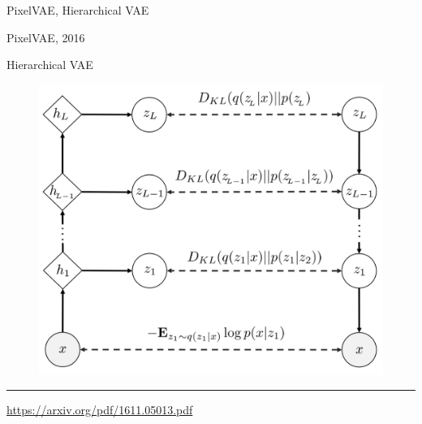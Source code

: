 \begin{frame}{PixelVAE, Hierarchical VAE}
\end{frame}
\begin{frame}{PixelVAE, 2016}
	\begin{block}{Hierarchical VAE}
		\begin{figure}
			\centering
			\includegraphics[width=0.7\linewidth]{figs/PixelVAE_1.png}
		\end{figure}
	\end{block}
	\vfill
	\hrule\medskip
	{\scriptsize \href{https://arxiv.org/pdf/1611.05013.pdf}{https://arxiv.org/pdf/1611.05013.pdf}}
\end{frame}
